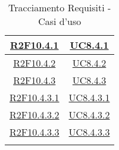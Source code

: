\begin{longtable}{|c|c|}
\hline
\hyperlink{R2F10.4.1}{R2F10.4.1} & \hyperlink{UC8.4.1}{UC8.4.1}\\
\hline
\hyperlink{R2F10.4.2}{R2F10.4.2} & \hyperlink{UC8.4.2}{UC8.4.2}\\
\hline
\hyperlink{R2F10.4.3}{R2F10.4.3} & \hyperlink{UC8.4.3}{UC8.4.3}\\
\hline
\hyperlink{R2F10.4.3.1}{R2F10.4.3.1} & \hyperlink{UC8.4.3.1}{UC8.4.3.1}\\
\hline
\hyperlink{R2F10.4.3.2}{R2F10.4.3.2} & \hyperlink{UC8.4.3.2}{UC8.4.3.2}\\
\hline
\hyperlink{R2F10.4.3.3}{R2F10.4.3.3} & \hyperlink{UC8.4.3.3}{UC8.4.3.3}\\
\hline
	\caption[Tracciamento Requisiti - Casi d'uso]{Tracciamento Requisiti - Casi d'uso}
	\label{tabella:requi-usecase}
\end{longtable}
\clearpage

